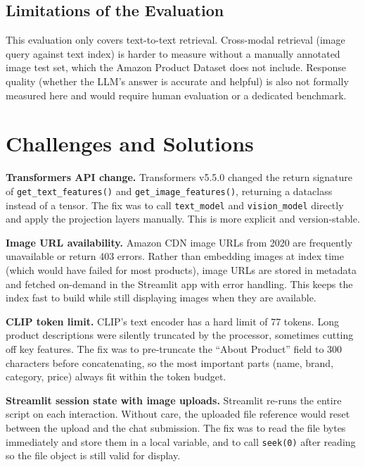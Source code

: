 \documentclass[11pt]{article}
\begin{document}
\subsection{Limitations of the Evaluation}
This evaluation only covers text-to-text retrieval. Cross-modal retrieval (image query
against text index) is harder to measure without a manually annotated image test set, which
the Amazon Product Dataset does not include. Response quality (whether the LLM's answer is
accurate and helpful) is also not formally measured here and would require human evaluation
or a dedicated benchmark.

\section{Challenges and Solutions}

\textbf{Transformers API change.}
Transformers v5.5.0 changed the return signature of \texttt{get\_text\_features()} and
\texttt{get\_image\_features()}, returning a dataclass instead of a tensor. The fix was to
call \texttt{text\_model} and \texttt{vision\_model} directly and apply the projection layers
manually. This is more explicit and version-stable.

\textbf{Image URL availability.}
Amazon CDN image URLs from 2020 are frequently unavailable or return 403 errors. Rather than
embedding images at index time (which would have failed for most products), image URLs are
stored in metadata and fetched on-demand in the Streamlit app with error handling. This keeps
the index fast to build while still displaying images when they are available.

\textbf{CLIP token limit.}
CLIP's text encoder has a hard limit of 77 tokens. Long product descriptions were silently
truncated by the processor, sometimes cutting off key features. The fix was to pre-truncate
the ``About Product'' field to 300 characters before concatenating, so the most important
parts (name, brand, category, price) always fit within the token budget.

\textbf{Streamlit session state with image uploads.}
Streamlit re-runs the entire script on each interaction. Without care, the uploaded file
reference would reset between the upload and the chat submission. The fix was to read the
file bytes immediately and store them in a local variable, and to call \texttt{seek(0)} after
reading so the file object is still valid for display.
\end{document}
